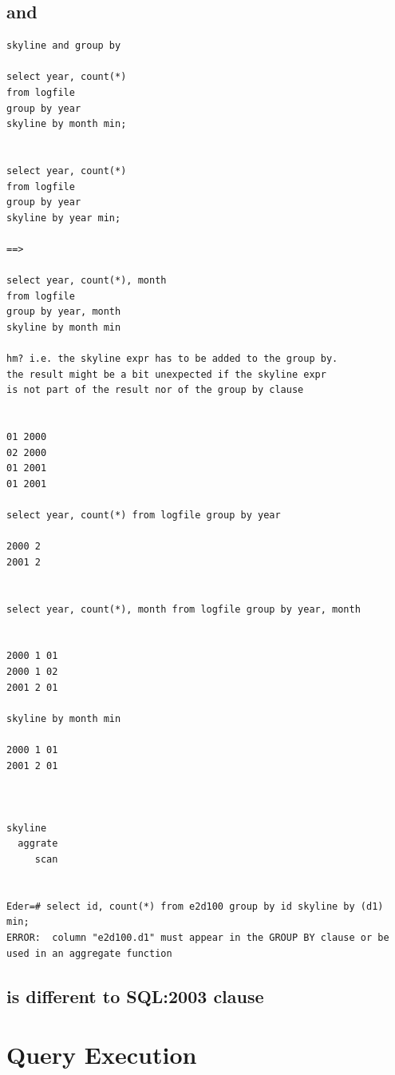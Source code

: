 \subsection{ and }
\begin{verbatim}
skyline and group by

select year, count(*)
from logfile
group by year
skyline by month min;


select year, count(*)
from logfile
group by year
skyline by year min;

==>

select year, count(*), month
from logfile
group by year, month
skyline by month min

hm? i.e. the skyline expr has to be added to the group by.
the result might be a bit unexpected if the skyline expr
is not part of the result nor of the group by clause


01 2000
02 2000
01 2001
01 2001

select year, count(*) from logfile group by year

2000 2
2001 2


select year, count(*), month from logfile group by year, month


2000 1 01
2000 1 02
2001 2 01

skyline by month min

2000 1 01
2001 2 01



skyline
  aggrate
     scan


Eder=# select id, count(*) from e2d100 group by id skyline by (d1) min;
ERROR:  column "e2d100.d1" must appear in the GROUP BY clause or be used in an aggregate function
\end{verbatim}

\subsection{ is different to SQL:2003  clause}


\section{Query Execution}

